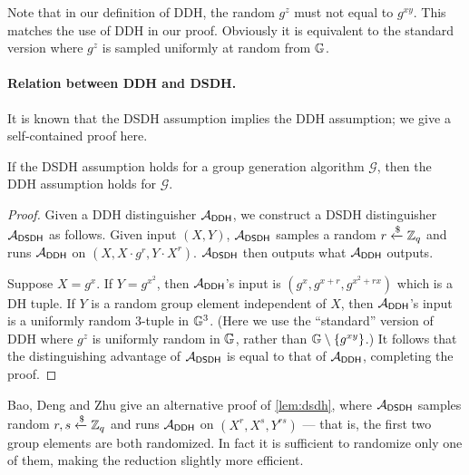 Note that in our definition of DDH, the random $g^z$ must not equal to $g^{xy}$. This matches the use of DDH in our proof. Obviously it is equivalent to the standard version where $g^z$ is sampled uniformly at random from $\mathbb{G}$.

\paragraph{Relation between DDH and DSDH.}
It is known that the DSDH assumption implies the DDH assumption; we give a self-contained proof here.
\begin{lemma}
\label{lem:dsdh}
If the DSDH assumption holds for a group generation algorithm $\mathcal{G}$, then the DDH assumption holds for $\mathcal{G}$.
\end{lemma}
\begin{proof}
Given a DDH distinguisher $\mathcal{A}_\mathsf{DDH}$, we construct a DSDH distinguisher $\mathcal{A}_\mathsf{DSDH}$ as follows. Given input $(X,Y)$, $\mathcal{A}_\mathsf{DSDH}$ samples a random $r\xleftarrow{\$}\mathbb{Z}_q$ and runs $\mathcal{A}_\mathsf{DDH}$ on $(X,X\cdot g^r,Y\cdot X^r)$. $\mathcal{A}_\mathsf{DSDH}$ then outputs what $\mathcal{A}_\mathsf{DDH}$ outputs.

Suppose $X = g^x$. If $Y = g^{x^2}$, then $\mathcal{A}_\mathsf{DDH}$'s input is $(g^x,g^{x+r},g^{x^2+rx})$ which is a DH tuple. If $Y$ is a random group element independent of $X$, then $\mathcal{A}_\mathsf{DDH}$'s input is a uniformly random 3-tuple in $\mathbb{G}^3$. (Here we use the ``standard'' version of DDH where $g^z$ is uniformly random in $\mathbb{G}$, rather than $\mathbb{G} \setminus \{g^{xy}\}$.) It follows that the distinguishing advantage of $\mathcal{A}_\mathsf{DSDH}$ is equal to that of $\mathcal{A}_\mathsf{DDH}$, completing the proof.
\end{proof}

\begin{remark}
Bao, Deng and Zhu \cite[Section~3.2]{ICICS:BaoDenZhu03} give an alternative proof of \cref{lem:dsdh}, where $\mathcal{A}_\mathsf{DSDH}$ samples random $r,s\xleftarrow{\$}\mathbb{Z}_q$ and runs $\mathcal{A}_\mathsf{DDH}$ on $(X^r,X^s,Y^{rs})$ --- that is, the first two group elements are both randomized. In fact it is sufficient to randomize only one of them, making the reduction slightly more efficient.
\end{remark}



